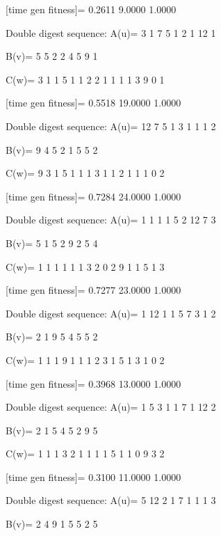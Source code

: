 [time gen fitness]=
    0.2611    9.0000    1.0000

Double digest sequence:
A(u)=
     3     1     7     5     1     2     1    12     1

B(v)=
     5     5     2     2     4     5     9     1

C(w)=
     3     1     1     5     1     1     2     2     1     1     1     1     3     9     0     1

[time gen fitness]=
    0.5518   19.0000    1.0000

Double digest sequence:
A(u)=
    12     7     5     1     3     1     1     1     2

B(v)=
     9     4     5     2     1     5     5     2

C(w)=
     9     3     1     5     1     1     1     3     1     1     2     1     1     1     0     2

[time gen fitness]=
    0.7284   24.0000    1.0000

Double digest sequence:
A(u)=
     1     1     1     1     5     2    12     7     3

B(v)=
     5     1     5     2     9     2     5     4

C(w)=
     1     1     1     1     1     1     3     2     0     2     9     1     1     5     1     3

[time gen fitness]=
    0.7277   23.0000    1.0000

Double digest sequence:
A(u)=
     1    12     1     1     5     7     3     1     2

B(v)=
     2     1     9     5     4     5     5     2

C(w)=
     1     1     1     9     1     1     1     2     3     1     5     1     3     1     0     2

[time gen fitness]=
    0.3968   13.0000    1.0000

Double digest sequence:
A(u)=
     1     5     3     1     1     7     1    12     2

B(v)=
     2     1     5     4     5     2     9     5

C(w)=
     1     1     1     3     2     1     1     1     1     5     1     1     0     9     3     2

[time gen fitness]=
    0.3100   11.0000    1.0000

Double digest sequence:
A(u)=
     5    12     2     1     7     1     1     1     3

B(v)=
     2     4     9     1     5     5     2     5

